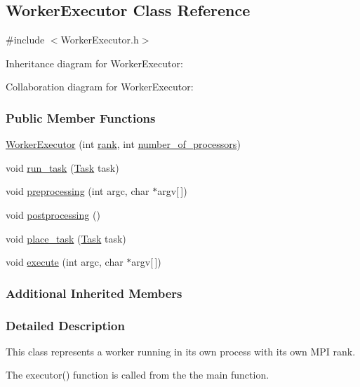 \hypertarget{a00041}{}\subsection{Worker\+Executor Class Reference}
\label{a00041}


{\ttfamily \#include $<$Worker\+Executor.\+h$>$}



Inheritance diagram for Worker\+Executor\+:


Collaboration diagram for Worker\+Executor\+:
\subsubsection*{Public Member Functions}
\begin{DoxyCompactItemize}
\item 
\hyperlink{a00041_aae5a80d4f64f2bc795b175697e15225f}{Worker\+Executor} (int \hyperlink{a00015_a33c24e2887b4d9c4ef7f3566d3bc803e}{rank}, int \hyperlink{a00015_a4e798bde66d26fe200de7e8d2b54e915}{number\+\_\+of\+\_\+processors})
\item 
void \hyperlink{a00041_a7edee52a5d96dea5da7dc0e0ba461b45}{run\+\_\+task} (\hyperlink{a00002}{Task} task)
\item 
void \hyperlink{a00041_ac3155d06d7807a1d9d305293b92d63ab}{preprocessing} (int argc, char $\ast$argv\mbox{[}$\,$\mbox{]})
\item 
void \hyperlink{a00041_aff4c1b156960d031d09e669014038cd5}{postprocessing} ()
\item 
void \hyperlink{a00041_a50f9307b592bb371535e00461d7d0133}{place\+\_\+task} (\hyperlink{a00002}{Task} task)
\item 
void \hyperlink{a00041_adb37338d137f4039d835519b14698d51}{execute} (int argc, char $\ast$argv\mbox{[}$\,$\mbox{]})
\end{DoxyCompactItemize}
\subsubsection*{Additional Inherited Members}


\subsubsection{Detailed Description}
This class represents a worker running in its own process with its own M\+P\+I rank.

The executor() function is called from the the main function.

